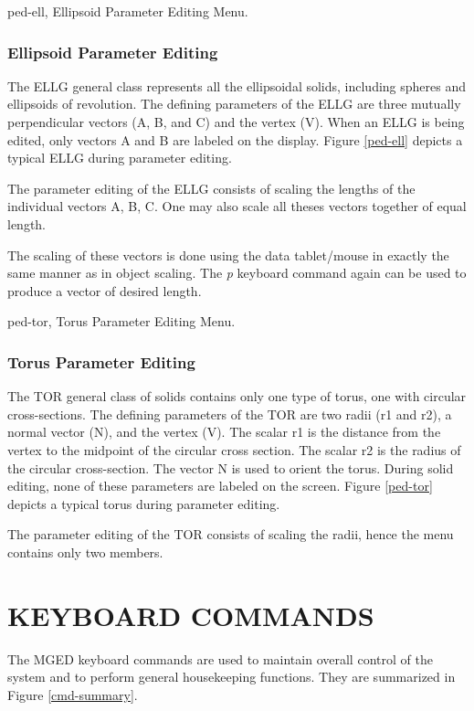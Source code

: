 \mfig ped-ell, Ellipsoid Parameter Editing Menu.
\subsection{Ellipsoid Parameter Editing}

The ELLG general class represents all the ellipsoidal solids, including
spheres and ellipsoids of revolution.
The defining parameters of the ELLG are three mutually perpendicular
vectors (A, B, and C) and the vertex (V).
When an ELLG is being edited, only vectors A and B are labeled on the display.
Figure \ref{ped-ell} depicts a typical ELLG during parameter editing.

The parameter editing of the ELLG consists of scaling the lengths of the
individual vectors A, B, C.
One may also scale all theses vectors together of equal length.

The scaling of these vectors is done using the data tablet/mouse in
exactly the same manner as in object scaling.
The {\em p} keyboard command again can be used to produce a vector of
desired length.

\mfig ped-tor, Torus Parameter Editing Menu.
\subsection{Torus Parameter Editing}

The TOR general class of solids contains only one type of torus, one with
circular cross-sections.
The defining parameters of the TOR are two radii (r1 and r2), a normal
vector (N), and the vertex (V).
The scalar r1 is the distance from the vertex to the midpoint of the
circular cross section.
The scalar r2 is the radius of the circular cross-section.
The vector N is used to orient the torus.
During solid editing, none of these parameters are labeled on the screen.
Figure \ref{ped-tor} depicts a typical torus during parameter editing.

The parameter editing of the TOR consists of scaling the radii, hence the
menu contains only two members.
\chapter{KEYBOARD COMMANDS}

The MGED keyboard commands are used to maintain overall control of the
system and to perform general housekeeping functions.
They are summarized in Figure \ref{cmd-summary}.

